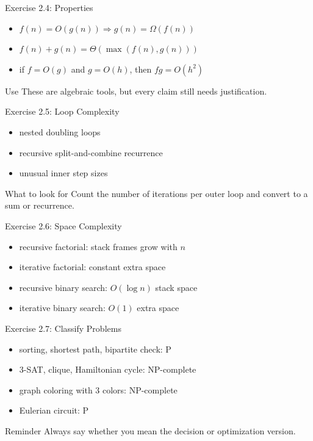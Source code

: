 \documentclass[aspectratio=169,xcolor=dvipsnames]{beamer}
\begin{document}
\begin{frame}{Exercise 2.4: Properties}
  \begin{itemize}
    \item $f(n)=O(g(n)) \Rightarrow g(n)=\Omega(f(n))$
    \item $f(n)+g(n)=\Theta(\max(f(n),g(n)))$
    \item if $f=O(g)$ and $g=O(h)$, then $f g = O(h^2)$
  \end{itemize}
  \begin{block}{Use}
    These are algebraic tools, but every claim still needs justification.
  \end{block}
\end{frame}

\begin{frame}{Exercise 2.5: Loop Complexity}
  \begin{itemize}
    \item nested doubling loops
    \item recursive split-and-combine recurrence
    \item unusual inner step sizes
  \end{itemize}
  \begin{exampleblock}{What to look for}
    Count the number of iterations per outer loop and convert to a sum or recurrence.
  \end{exampleblock}
\end{frame}

\begin{frame}{Exercise 2.6: Space Complexity}
  \begin{itemize}
    \item recursive factorial: stack frames grow with $n$
    \item iterative factorial: constant extra space
    \item recursive binary search: $O(\log n)$ stack space
    \item iterative binary search: $O(1)$ extra space
  \end{itemize}
\end{frame}

\begin{frame}{Exercise 2.7: Classify Problems}
  \begin{itemize}
    \item sorting, shortest path, bipartite check: P
    \item 3-SAT, clique, Hamiltonian cycle: NP-complete
    \item graph coloring with 3 colors: NP-complete
    \item Eulerian circuit: P
  \end{itemize}
  \begin{block}{Reminder}
    Always say whether you mean the decision or optimization version.
  \end{block}
\end{frame}
\end{document}
